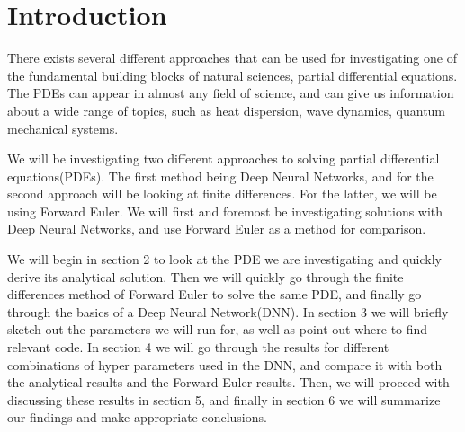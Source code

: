 \section{Introduction}
There exists several different approaches that can be used for investigating one of the fundamental building blocks of natural sciences, partial differential equations. The PDEs can appear in almost any field of science, and can give us information about a wide range of topics, such as heat dispersion, wave dynamics, quantum mechanical systems\citep[see][ch. 10]{hjorth-jensen_computational_2015}.

We will be investigating two different approaches to solving partial differential equations(PDEs). The first method being Deep Neural Networks, and for the second approach will be looking at finite differences. For the latter, we will be using Forward Euler. We will first and foremost be investigating solutions with Deep Neural Networks, and use Forward Euler as a method for comparison.

We will begin in section 2 to look at the PDE we are investigating and quickly derive its analytical solution. Then we will quickly go through the finite differences method of Forward Euler to solve the same PDE, and finally go through the basics of a Deep Neural Network(DNN). In section 3 we will briefly sketch out the parameters we will run for, as well as point out where to find relevant code. In section 4 we will go through the results for different combinations of hyper parameters used in the DNN, and compare it with both the analytical results and the Forward Euler results. Then, we will proceed with discussing these results in section 5, and finally in section 6 we will summarize our findings and make appropriate conclusions.